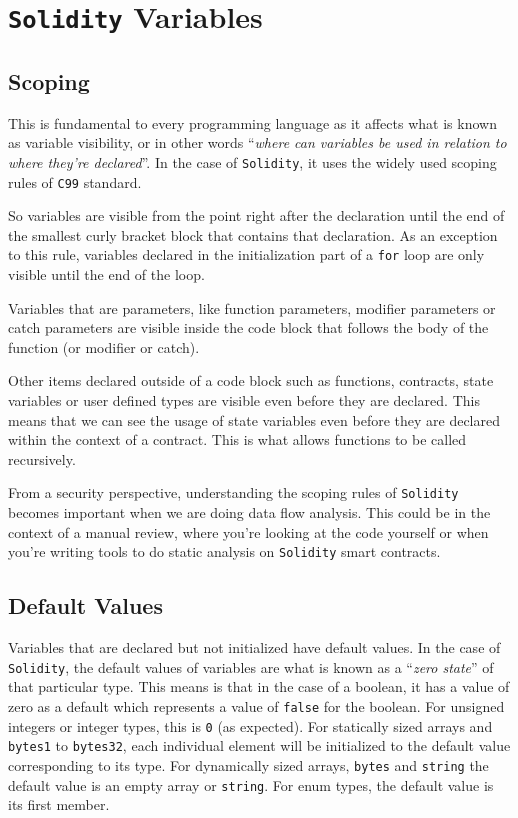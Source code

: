\section{\texorpdfstring{\texttt{Solidity}
Variables}{Solidity Variables}}\label{solidity-variables}

\subsection{Scoping}\label{scoping}

This is fundamental to every programming language as it affects what is
known as variable visibility, or in other words ``\emph{where can
variables be used in relation to where they're declared}''. In the case
of \texttt{Solidity}, it uses the widely used scoping rules of
\texttt{C99} standard.

So variables are visible from the point right after the declaration
until the end of the smallest curly bracket block that contains that
declaration. As an exception to this rule, variables declared in the
initialization part of a \texttt{for} loop are only visible until the
end of the loop.

Variables that are parameters, like function parameters, modifier
parameters or catch parameters are visible inside the code block that
follows the body of the function (or modifier or catch).

Other items declared outside of a code block such as functions,
contracts, state variables or user defined types are visible even before
they are declared. This means that we can see the usage of state
variables even before they are declared within the context of a
contract. This is what allows functions to be called recursively.

From a security perspective, understanding the scoping rules of
\texttt{Solidity} becomes important when we are doing data flow
analysis. This could be in the context of a manual review, where you're
looking at the code yourself or when you're writing tools to do static
analysis on \texttt{Solidity} smart contracts.

\subsection{Default Values}\label{default-values}

Variables that are declared but not initialized have default values. In
the case of \texttt{Solidity}, the default values of variables are what
is known as a ``\emph{zero state}'' of that particular type. This means
is that in the case of a boolean, it has a value of zero as a default
which represents a value of \texttt{false} for the boolean. For unsigned
integers or integer types, this is \texttt{0} (as expected). For
statically sized arrays and \texttt{bytes1} to \texttt{bytes32}, each
individual element will be initialized to the default value
corresponding to its type. For dynamically sized arrays, \texttt{bytes}
and \texttt{string} the default value is an empty array or
\texttt{string}. For enum types, the default value is its first member.

